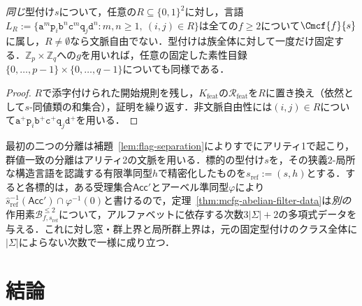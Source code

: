 \begin{corollary}[一様な有限素性の認可]
\label{cor:feature-relation-family}
\emph{同じ}型付け$s$について，任意の$R\subseteq\{0,1\}^2$に対し，言語$L_R:=\{\mathtt a^m\mathtt p_i\mathtt b^n\mathtt c^m\mathtt q_j\mathtt d^n:m,n\ge1,\ (i,j)\in R\}$は全ての$f\ge2$について$\Cmcf{f}{s}$に属し，$R\ne\emptyset$なら文脈自由でない．型付けは族全体に対して一度だけ固定する．$\mathbb Z_p\times\mathbb Z_q$への$g$を用いれば，任意の固定した素性目録$\{0,\ldots,p-1\}\times\{0,\ldots,q-1\}$についても同様である．
\end{corollary}

\begin{proof}
$R$で添字付けられた開始規則を残し，$K_{\mathrm{feat}}$の$\mathcal R_{\mathrm{feat}}$を$R$に置き換え（依然として$s$-同値類の和集合），証明を繰り返す．非文脈自由性には$(i,j)\in R$について$\mathtt a^+\mathtt p_i\mathtt b^+\mathtt c^+\mathtt q_j\mathtt d^+$を用いる．
\end{proof}

\begin{remark}[型付けクラスの分離が意味する範囲]
\label{rem:necessity-scope}
最初の二つの分離は補題~\ref{lem:flag-separation}によりすでにアリティ1で起こり，群値一致の分離はアリティ2の文脈を用いる．標的の型付け$s$を，その狭義2-局所な構造言語を認識する有限準同型$h$で精密化したものを$s_{\mathrm{ref}}:=(s,h)$とする．すると各標的は，ある受理集合$\mathsf{Acc}'$とアーベル準同型$\varphi$により$\widehat s_{\mathrm{ref}}^{-1}(\mathsf{Acc}')\cap\varphi^{-1}(0)$と書けるので，定理~\ref{thm:mcfg-abelian-filter-data}は\emph{別の}作用素$\mathcal B^{\le2}_{f,s_{\mathrm{ref}}}$について，アルファベットに依存する次数$3|\Sigma|+2$の多項式データを与える．これに対し窓・群上界と局所群上界は，元の固定型付けのクラス全体に$|\Sigma|$によらない次数で一様に成り立つ．
\end{remark}

\section{結論}
\label{sec:conclusion}

